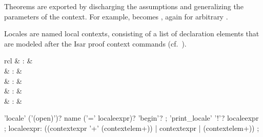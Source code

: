 \begin{isabellebody}
\begin{isamarkuptext}
  Theorems are exported by discharging the assumptions and
  generalizing the parameters of the context.  For example,  becomes , again for arbitrary
  .%
\end{isamarkuptext}%
\isamarkuptrue%
%
\isamarkuptrue%
%
\begin{isamarkuptext}%
Locales are named local contexts, consisting of a list of
  declaration elements that are modeled after the Isar proof context
  commands (cf.\ ).%
\end{isamarkuptext}%
\isamarkuptrue%
%
\isamarkuptrue%
%
\begin{isamarkuptext}%
\begin{matharray}{rcl}
    \hypertarget{command.locale}{\hyperlink{command.locale}{\mbox{}}} & : &  \\
    \hypertarget{command.print_locale}{\hyperlink{command.print_locale}{\mbox{}}}\isa{{\isachardoublequote}\isactrlsup {\isacharasterisk}{\isachardoublequote}} & : &  \\
    \hypertarget{command.print_locales}{\hyperlink{command.print_locales}{\mbox{}}}\isa{{\isachardoublequote}\isactrlsup {\isacharasterisk}{\isachardoublequote}} & : &  \\
    \hypertarget{method.intro_locales}{\hyperlink{method.intro_locales}{\mbox{}}} & : & \isarmeth \\
    \hypertarget{method.unfold_locales}{\hyperlink{method.unfold_locales}{\mbox{}}} & : & \isarmeth \\
  \end{matharray}

  \begin{rail}
    'locale' ('(open)')? name ('=' localeexpr)? 'begin'?
    ;
    'print\_locale' '!'? localeexpr
    ;
    localeexpr: ((contextexpr '+' (contextelem+)) | contextexpr | (contextelem+))
    ;


\end{rail}
\end{isamarkuptext}
\end{isabellebody}
